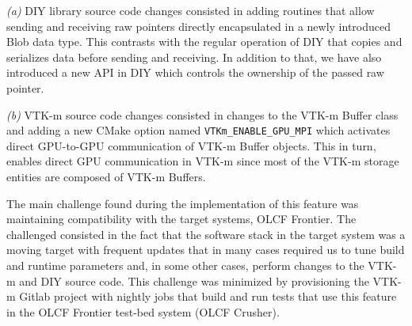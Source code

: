 \textit{(a)} DIY library source code changes consisted in adding routines that allow sending and receiving raw pointers directly encapsulated in a newly introduced Blob data type. This contrasts with the regular operation of DIY that copies and serializes data before sending and receiving. In addition to that, we have also introduced a new API in DIY which controls the ownership of the passed raw pointer.

\textit{(b)} VTK-m source code changes consisted in changes to the VTK-m Buffer class and  adding a new CMake option named \texttt{VTKm\_ENABLE\_GPU\_MPI} which activates direct GPU-to-GPU communication of VTK-m Buffer objects. This in turn, enables direct GPU communication in VTK-m since most of the VTK-m storage entities are composed of VTK-m Buffers. 

The main challenge found during the implementation of this feature was maintaining compatibility with the target systems, OLCF Frontier. The challenged consisted in the fact that the software stack in the target system was a moving target with frequent updates that in many cases required us to tune build and runtime parameters and, in some other cases, perform changes to the VTK-m and DIY source code. This challenge was minimized by provisioning the VTK-m Gitlab project with nightly jobs that build and run tests that use this feature in the OLCF Frontier test-bed system (OLCF Crusher). 
